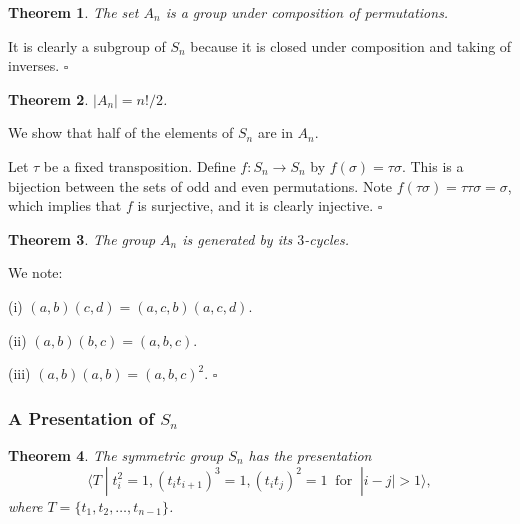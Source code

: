 \documentclass[10pt]{article}
\newtheorem{theorem}{Theorem}[section]
\newenvironment{proof}[1][Proof]{\begin{trivlist}
\item[\hskip \labelsep {\itshape #1}]}{\end{trivlist}}
\begin{document}
\begin{theorem}
The set $A_n$ is a group under composition of permutations.
\end{theorem}

\begin{proof}
It is clearly a subgroup of $S_n$ because it is closed under composition and taking of inverses. $\square$
\end{proof}

\begin{theorem}
$|A_n| = n!/2$.
\end{theorem}

\begin{proof}
We show that half of the elements of $S_n$ are in $A_n$.

Let $\tau$ be a fixed transposition. Define $f : S_n \to S_n$ by $f(\sigma) = \tau\sigma$. This is a bijection between the sets of odd and even permutations. Note $f(\tau\sigma) = \tau\tau\sigma = \sigma$, which implies that $f$ is surjective, and it is clearly injective. $\square$
\end{proof}

\begin{theorem}
The group $A_n$ is generated by its $3$-cycles.
\end{theorem}

\begin{proof}
We note:

(i) $(a, b)(c, d) = (a, c, b)(a, c, d)$.

(ii) $(a, b)(b, c) = (a, b, c)$.

(iii) $(a, b)(a, b) = (a, b, c)^2$. $\square$
\end{proof}

\subsubsection{A Presentation of $S_n$}

\begin{theorem}
The symmetric group $S_n$ has the presentation
$$\langle T \;|\; t_i^2 = 1, (t_it_{i+1})^3 = 1, (t_it_j)^2 = 1 \;\;\mbox{for}\;\; |i - j| > 1 \rangle,$$
where $T = \{t_1, t_2, \ldots, t_{n-1}\}$.
\end{theorem}
\end{document}
